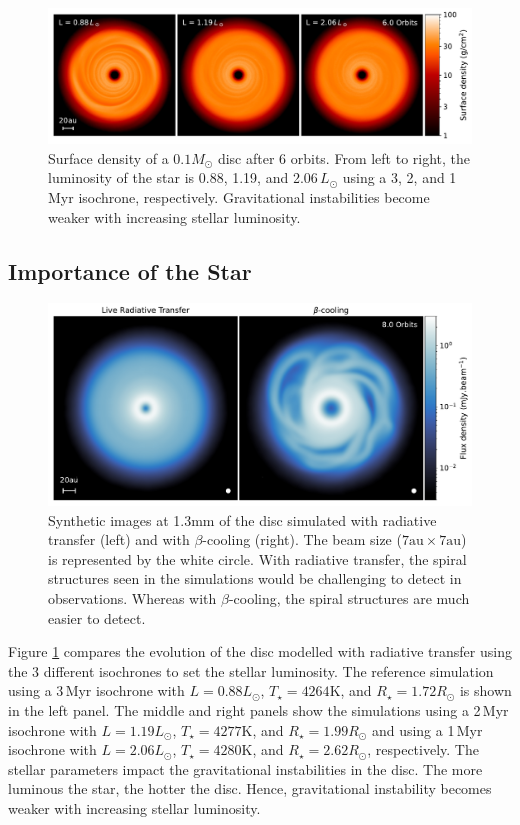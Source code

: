 \documentclass[usenatbib]{mnras}
\begin{document}
\begin{figure}
    \centering
    \includegraphics[width=\linewidth]{impact_of_star.pdf}
    \caption{Surface density of a $0.1M_\odot$ disc after 6 orbits. From left to right, the luminosity of the star is 0.88, 1.19, and 2.06$\,L_\odot$ using a 3, 2, and 1\,Myr isochrone, respectively. Gravitational instabilities become weaker with increasing stellar luminosity.}
    \label{fig:star_comparison}
\end{figure}

\subsection{Importance of the Star}

\begin{figure}
    \centering
    \includegraphics[width=\linewidth]{Images/Comparison_Synth_image_1.3mm_log.pdf}
    \caption{Synthetic images at 1.3mm of the disc simulated with radiative transfer (left) and with $\beta$-cooling (right). The beam size ($7\text{au} \times 7\text{au}$) is represented by the white circle. With radiative transfer, the spiral structures seen in the simulations would be challenging to detect in observations. Whereas with $\beta$-cooling, the spiral structures are much easier to detect.
    }
    \label{fig:synthImg}
\end{figure}


Figure \ref{fig:star_comparison} compares the evolution of the disc modelled with radiative transfer using the 3 different isochrones to set the stellar luminosity. The reference simulation using a 3\,Myr isochrone with $L = 0.88L_\odot$, $T_\star = 4264$K, and $R_\star = 1.72R_\odot$ is shown in the left panel. The middle and right panels show the simulations using a 2\,Myr isochrone with $L = 1.19L_\odot$, $T_\star = 4277$K, and $R_\star = 1.99R_\odot$ and using a 1\,Myr isochrone with $L = 2.06L_\odot$, $T_\star = 4280$K, and $R_\star = 2.62R_\odot$, respectively. The stellar parameters impact the gravitational instabilities in the disc. The more luminous the star, the hotter the disc. Hence, gravitational instability becomes weaker with increasing stellar luminosity.
\end{document}
